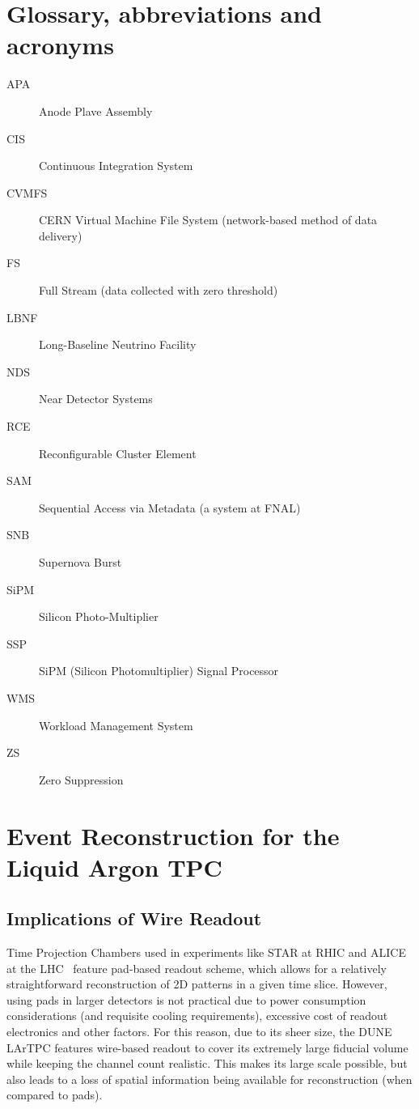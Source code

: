 \appendix
\section{Glossary, abbreviations and acronyms}

\begin{description}
\item[APA] Anode Plave Assembly
\item[CIS] Continuous Integration System
\item[CVMFS] CERN Virtual Machine File System (network-based method of data delivery)
\item[FS] Full Stream (data collected with zero threshold)
\item[LBNF] Long-Baseline Neutrino Facility
\item[NDS] Near Detector Systems
\item[RCE] Reconfigurable Cluster Element
\item[SAM] Sequential Access via Metadata (a system at FNAL)
\item[SNB] Supernova Burst
\item[SiPM] Silicon Photo-Multiplier
\item[SSP] SiPM (Silicon Photomultiplier) Signal Processor
\item[WMS] Workload Management System
\item[ZS] Zero Suppression
\end{description}

\section{Event Reconstruction for the Liquid Argon TPC}
\label{sec:reconstruction}
\subsection{Implications of Wire Readout}
Time Projection Chambers used in experiments like STAR at RHIC and ALICE at the LHC~\cite{alice}  feature
pad-based readout scheme, which allows for a relatively straightforward reconstruction of 2D patterns in
a given time slice. However, using pads in larger detectors is not practical due to power consumption considerations
(and requisite cooling requirements), excessive cost of readout electronics and other factors. For this reason, due to its sheer size, the DUNE LArTPC features wire-based readout to cover its extremely large fiducial volume while keeping the channel count realistic. This makes its large scale possible, but also leads to a loss of spatial information being available for reconstruction (when compared to pads).

